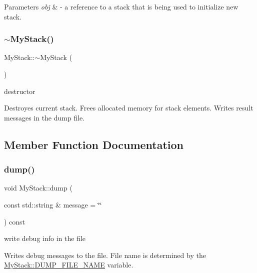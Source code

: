 \begin{DoxyParams}{Parameters}
{\em obj} & -\/ a reference to a stack that is being used to initialize new stack. \\
\hline
\end{DoxyParams}
\mbox{\label{class_my_stack_aef06833eaa332c29f0e24e6816e2715f}} 
\subsubsection{\texorpdfstring{$\sim$\+My\+Stack()}{~MyStack()}}
{\footnotesize\ttfamily My\+Stack\+::$\sim$\+My\+Stack (\begin{DoxyParamCaption}{ }\end{DoxyParamCaption})}



destructor 

Destroyes current stack. Frees allocated memory for stack elements. Writes result messages in the dump file. 

\subsection{Member Function Documentation}
\mbox{\label{class_my_stack_a74626170a79ad9392cc987ef711e2933}} 
\subsubsection{\texorpdfstring{dump()}{dump()}}
{\footnotesize\ttfamily void My\+Stack\+::dump (\begin{DoxyParamCaption}\item[{const std\+::string \&}]{message = {\ttfamily \char`\"{}\char`\"{}} }\end{DoxyParamCaption}) const\hspace{0.3cm}{\ttfamily [private]}}



write debug info in the file 

Writes debug messages to the file. File name is determined by the \hyperlink{class_my_stack_ab3912249fbbd11acf6f4016d3aba1b89}{My\+Stack\+::\+D\+U\+M\+P\+\_\+\+F\+I\+L\+E\+\_\+\+N\+A\+ME} variable.


